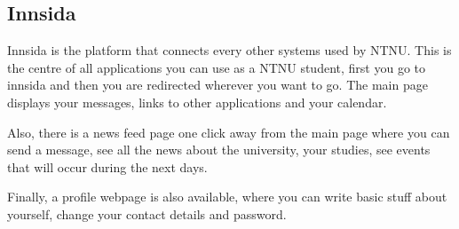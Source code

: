 \subsection{Innsida}

Innsida is the platform that connects every other systems used by NTNU. This is the centre of all applications you can use as a NTNU student, first you go to innsida and then you are redirected wherever you want to go. The main page displays your messages, links to other applications and your calendar. 
\par
Also, there is a news feed page one click away from the main page where you can send a message, see all the news about the university, your studies, see events that will occur during the next days. 
\par
Finally, a profile webpage is also available, where you can write basic stuff about yourself, change your contact details and password.